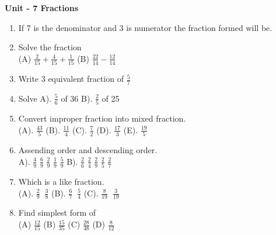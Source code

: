 \centerline{\textbf{ \LARGE  Unit - 7 \quad Fractions }}

\begin{enumerate}

    \item If 7 is the denominator and 3 is numerator the fraction formed will be.

    \item Solve the fraction \\ (A) { \large \( \frac{2}{15} + \frac{4}{15} + \frac{1}{15} \) }
            \qquad (B) { \large \( \frac{22}{14} - \frac{12}{14} \) }

    \item Write 3 equivalent fraction of  { \large \( \frac{5}{7} \) }

    \item Solve \quad A). {\large\(\frac{5}{6}\)} of 36 \quad B). {\large\(\frac{2}{5}\)} of 25

    \item Convert improper fraction into mixed fraction. \\ (A). { \large\(\frac{43}{5}\) \quad (B). \large\(\frac{11}{4}\)
        \quad (C). \large\(\frac{7}{2}\) \quad (D). \large\(\frac{17}{3}\) \quad (E). \large\(\frac{19}{5}\)\;\;}

    \item Assending order and descending order. \\ A). { \large\(\frac{4}{9}\)\;\; \large\(\frac{6}{9}\)\;\;
        \large\(\frac{2}{9}\)\;\; \large\(\frac{1}{9}\)\;\; \large\(\frac{5}{9}\)\;\;}
         \qquad B). { \large\(\frac{2}{6}\)\;\; \large\(\frac{2}{4}\)\;\;
        \large\(\frac{2}{9}\)\;\; \large\(\frac{2}{5}\)\;\; \large\(\frac{2}{7}\)\;\;}

    \item Which is a like fraction.
        \\ (A). { \large \( \frac{2}{9} \; \; \frac{3}{8} \) } \qquad
           (B). { \large \( \frac{6}{7} \; \; \frac{5}{4} \) } \qquad
           (C). { \large \( \frac{8}{19} \; \; \frac{3}{19} \) } \qquad

    \item Find simplest form of \\ (A) { \large \( \frac{12}{15} \) \; \; (B) \( \frac{15}{35} \) \; \; (C) \( \frac{28}{48} \) \; \; (D) \( \frac{8}{12} \) }

\end{enumerate}
